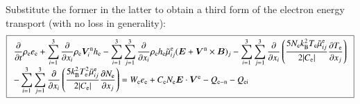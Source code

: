 \documentclass{warpdoc}
\newcommand\frameeqn[1]{\fbox{$\displaystyle #1$}}
\newcommand{\mfd}{\displaystyle}
\renewcommand{\vec}[1]{\bm{#1}}
\begin{document}
%  
Substitute the former in the latter to obtain a third form of the electron energy transport (with no loss in generality):
%
\begin{equation}
\frameeqn{
\begin{array}{l}\mfd
 \frac{\partial }{\partial t}\rho_{\rm e} e_{\rm e} + \sum_{i=1}^3  \frac{\partial }{\partial x_i} \rho_{\rm e} \vec{V}^{\rm n}_i h_{\rm e} 
  - \sum_{i=1}^3 \sum_{j=1}^3 \frac{\partial}{\partial x_i} \rho_{\rm e} h_{\rm e} \tilde{\mu}_{ij}^{\rm e} (\vec{E}+\vec{V}^{\rm n}\times\vec{B})_j 
  -\sum_{i=1}^3 \sum_{j=1}^3 \frac{\partial}{\partial x_i} \left( \frac{5 N_{\rm e} k_{\rm B}^2 T_{\rm e} \tilde{\mu}_{ij}^{\rm e} }{2 |C_{\rm e}| } \frac{  \partial T_{\rm e}}{\partial x_j} \right)
  \\ \mfd
  -\sum_{i=1}^3 \sum_{j=1}^3 \frac{\partial}{\partial x_i} \left(\frac{5 k_{\rm B}^2 T_{\rm e}^2 \tilde{\mu}_{ij}^{\rm e}}{2 |C_{\rm e}| } \frac{\partial N_{\rm e}  }{\partial x_j} \right)
= 
 W_{\rm e} e_{\rm e}
+   C_{\rm e} N_{\rm e} \vec{E} \cdot \vec{V}^{\rm e}  
- Q_{\rm e-n}
- Q_{\rm ei}
\end{array}
}
\end{equation}
%  
\end{document}
